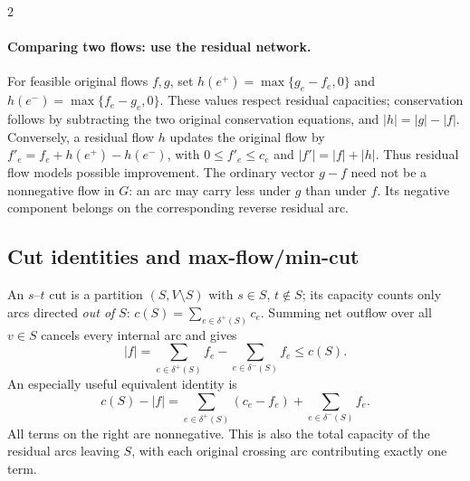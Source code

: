 \documentclass[10pt]{article}
\theoremstyle{definition}
\begin{document}
\begin{multicols*}{2}
\paragraph{Comparing two flows: use the residual network.}
For feasible original flows $f,g$, set $h(e^+)=\max\{g_e-f_e,0\}$ and
$h(e^-)=\max\{f_e-g_e,0\}$. These values respect residual capacities;
conservation follows by subtracting the two original conservation equations,
and $|h|=|g|-|f|$. Conversely, a residual flow $h$ updates the original flow by
$f'_e=f_e+h(e^+)-h(e^-)$, with $0\le f'_e\le c_e$ and
$|f'|=|f|+|h|$. Thus residual flow models possible improvement.
The ordinary vector $g-f$ need not be a nonnegative flow in $G$: an arc may
carry less under $g$ than under $f$. Its negative component belongs on the
corresponding reverse residual arc.

\subsection{Cut identities and max-flow/min-cut}\label{nf:cuts}
An $s$--$t$ cut is a partition $(S,V\setminus S)$ with $s\in S$, $t\notin S$;
its capacity counts only arcs directed \emph{out of} $S$:
$c(S)=\sum_{e\in\delta^+(S)}c_e$.
Summing net outflow over all $v\in S$ cancels every internal arc and gives
\begin{equation}\label{nf:cut-identity}
 \boxed{|f|=\sum_{e\in\delta^+(S)}f_e-\sum_{e\in\delta^-(S)}f_e\le c(S).}
\end{equation}
An especially useful equivalent identity is
\begin{equation}\label{nf:cut-slack}
 \boxed{c(S)-|f|=
 \sum_{e\in\delta^+(S)}(c_e-f_e)+\sum_{e\in\delta^-(S)}f_e.}
\end{equation}
All terms on the right are nonnegative. This is also the total capacity
of the residual arcs leaving $S$, with each original crossing arc contributing
exactly one term.


\end{multicols*}
\end{document}
